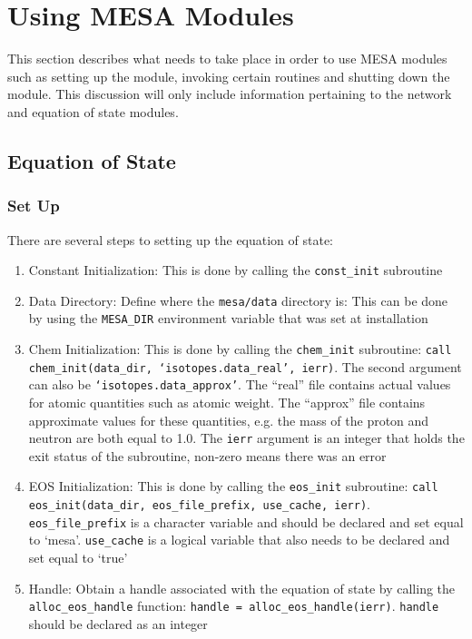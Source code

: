 \section{Using {\sf MESA} Modules}

This section describes what needs to take place in order to use 
{\sf MESA} modules such as setting up the module, invoking certain routines 
and shutting down the module. This discussion will only include information 
pertaining to the network and equation of state modules.

\subsection{Equation of State}

\subsubsection{Set Up}

There are several steps to setting up the equation of state:
\begin{enumerate}
\item Constant Initialization: This is done by calling the {\tt const\_init} 
subroutine

\item Data Directory: Define where the {\tt mesa/data} directory is: This can 
be done by using the {\tt MESA\_DIR} environment variable that was set 
at installation

\item Chem Initialization: This is done by calling the {\tt chem\_init} 
subroutine: {\tt call chem\_init(data\_dir, `isotopes.data\_real', ierr)}. 
The second argument can also be {\tt `isotopes.data\_approx'}. The ``real'' 
file contains actual values for 
atomic quantities such as atomic weight. The ``approx'' file contains 
approximate values for these quantities, e.g. the mass of the proton and 
neutron are both equal to 1.0. The {\tt ierr} argument is an integer that 
holds the exit status of the subroutine, non-zero means there was an error

\item EOS Initialization: This is done by calling the {\tt eos\_init} 
subroutine: {\tt call eos\_init(data\_dir, eos\_file\_prefix, use\_cache, 
ierr)}. {\tt eos\_file\_prefix} is a character variable and should be 
declared and set equal to `mesa'. {\tt use\_cache} is a logical variable that 
also needs to be declared and set equal to `true'

\item Handle: Obtain a handle associated with the equation of state by 
calling the {\tt alloc\_eos\_handle} function: 
{\tt handle = alloc\_eos\_handle(ierr)}. {\tt handle} should be declared as an 
integer
\end{enumerate}

